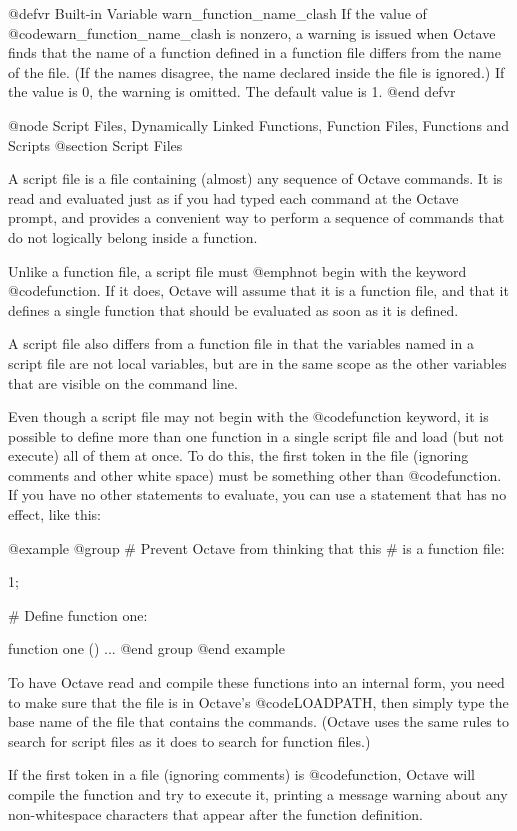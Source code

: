 @defvr {Built-in Variable} warn_function_name_clash
If the value of @code{warn_function_name_clash} is nonzero, a warning is
issued when Octave finds that the name of a function defined in a
function file differs from the name of the file.  (If the names
disagree, the name declared inside the file is ignored.)  If the value
is 0, the warning is omitted.  The default value is 1.
@end defvr

@node Script Files, Dynamically Linked Functions, Function Files, Functions and Scripts
@section Script Files

A script file is a file containing (almost) any sequence of Octave
commands.  It is read and evaluated just as if you had typed each
command at the Octave prompt, and provides a convenient way to perform a
sequence of commands that do not logically belong inside a function.

Unlike a function file, a script file must @emph{not} begin with the
keyword @code{function}.  If it does, Octave will assume that it is a
function file, and that it defines a single function that should be
evaluated as soon as it is defined.

A script file also differs from a function file in that the variables
named in a script file are not local variables, but are in the same
scope as the other variables that are visible on the command line.

Even though a script file may not begin with the @code{function}
keyword, it is possible to define more than one function in a single
script file and load (but not execute) all of them at once.  To do 
this, the first token in the file (ignoring comments and other white
space) must be something other than @code{function}.  If you have no
other statements to evaluate, you can use a statement that has no
effect, like this:

@example
@group
# Prevent Octave from thinking that this
# is a function file:

1;

# Define function one:

function one ()
  ...
@end group
@end example

To have Octave read and compile these functions into an internal form,
you need to make sure that the file is in Octave's @code{LOADPATH}, then
simply type the base name of the file that contains the commands.
(Octave uses the same rules to search for script files as it does to
search for function files.)

If the first token in a file (ignoring comments) is @code{function},
Octave will compile the function and try to execute it, printing a
message warning about any non-whitespace characters that appear after
the function definition.

